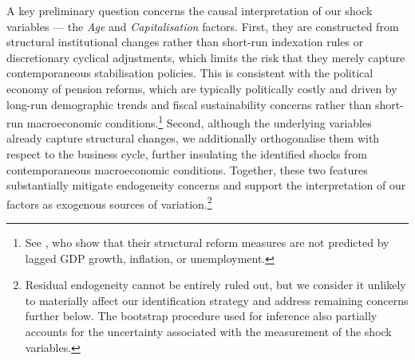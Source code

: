 \documentclass[11pt,english,a4paper, twoside, authoryear]{article}
\begin{document}
A key preliminary question concerns the causal interpretation of our shock variables --- the \emph{Age} and \emph{Capitalisation} factors. First, they are constructed from structural institutional changes rather than short-run indexation rules or discretionary cyclical adjustments, which limits the risk that they merely capture contemporaneous stabilisation policies. This is consistent with the political economy of pension reforms, which are typically politically costly and driven by long-run demographic trends and fiscal sustainability concerns rather than short-run macroeconomic conditions.\footnote{See \citet{BiZubairy2023}, who show that their structural reform measures are not predicted by lagged GDP growth, inflation, or unemployment.} Second, although the underlying variables already capture structural changes, we additionally orthogonalise them with respect to the business cycle, further insulating the identified shocks from contemporaneous macroeconomic conditions. Together, these two features substantially mitigate endogeneity concerns and support the interpretation of our factors as exogenous sources of variation.\footnote{Residual endogeneity cannot be entirely ruled out, but we consider it unlikely to materially affect our identification strategy and address remaining concerns further below. The bootstrap procedure used for inference also partially accounts for the uncertainty associated with the measurement of the shock variables.}
\end{document}
